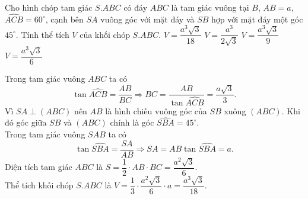 \begin{ex}%
 Cho hình chóp tam giác $S.ABC$ có đáy $ABC$ là tam giác vuông tại $B$, $AB = a$, $\widehat{ACB} = 60^\circ$, cạnh bên $SA$ vuông góc với mặt đáy và $SB$ hợp với mặt đáy một góc $45^\circ$. Tính thể tích $V$ của khối chóp $S.ABC$.
 \choice
  {\True $V = \dfrac{a^3 \sqrt{3}}{18}$}
  {$V = \dfrac{a^3}{2\sqrt{3}}$}
  {$V = \dfrac{a^3 \sqrt{3}}{9}$}
  {$V = \dfrac{a^3 \sqrt{3}}{6}$}
 \loigiai
  {
  \immini
   {
   Trong tam giác vuông $ABC$ ta có
   $$\tan \widehat{ACB} = \dfrac{AB}{BC} \Rightarrow BC = \dfrac{AB}{\tan \widehat{ACB}} = \dfrac{a \sqrt{3}}{3}.$$
   Vì $SA \perp (ABC)$ nên $AB$ là hình chiếu vuông góc của $SB$ xuông $(ABC)$. Khi đó góc giữa $SB$ và $(ABC)$ chính là góc $\widehat{SBA} = 45^\circ$.\\
   Trong tam giác vuông $SAB$ ta có
   $$\tan \widehat{SBA} = \dfrac{SA}{AB} \Rightarrow SA = AB \tan \widehat{SBA} = a.$$
   Diện tích tam giác $ABC$ là $S = \dfrac{1}{2} \cdot AB \cdot BC = \dfrac{a^2 \sqrt{3}}{6}$.\\
   Thể tích khối chóp $S.ABC$ là $V = \dfrac{1}{3} \cdot \dfrac{a^2 \sqrt{3}}{6} \cdot a = \dfrac{a^3 \sqrt{3}}{18}$.
   }
   {
   }
  }
\end{ex}

